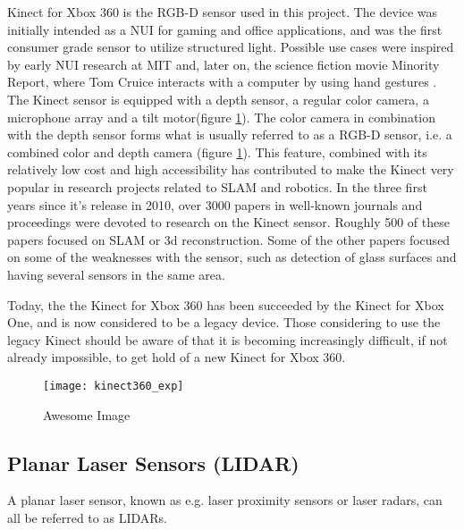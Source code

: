 Kinect for Xbox 360 is the RGB-D sensor used in this project. The device  was initially intended as a \ac{NUI} for gaming and office applications, and was the first consumer grade sensor to utilize structured light. Possible use cases were inspired by early \ac{NUI} research at \ac{MIT} and, later on, the science fiction movie Minority Report, where Tom Cruice interacts with a computer by using hand gestures \cite{kinect_book}. The Kinect sensor is equipped with a depth sensor, a regular color camera, a microphone array and a tilt motor(figure \ref{fig:kinect360_exp}). The color camera in combination with the depth sensor forms what is usually referred to as a RGB-D sensor, i.e. a combined color and depth camera (figure \ref{fig:kinect360_exp}). This feature, combined with its relatively low cost and high accessibility has contributed to make the Kinect very popular in research projects related to \ac{SLAM} and robotics. In the three first years since it's release in 2010, over 3000 papers in well-known journals and proceedings were devoted to research on the Kinect sensor. Roughly 500 of these papers focused on \ac{SLAM} or 3d reconstruction\cite{Berger2013}. Some of the other papers focused on some of the weaknesses with the sensor, such as detection of glass surfaces and having several sensors in the same area. 


Today, the the Kinect for Xbox 360 has been succeeded by the Kinect for Xbox One, and is now considered to be a legacy device. Those considering to use the legacy Kinect should be aware of that it is becoming increasingly difficult, if not already impossible, to get hold of a new Kinect for Xbox 360. 


\begin{figure}[p]
    \centering
    \texttt{[image: kinect360\_exp]}
    \caption{Awesome Image}
    \label{fig:kinect360_exp}
\end{figure}


\subsection{Planar Laser Sensors (LIDAR)}

A planar laser sensor, known as e.g. laser proximity sensors or laser radars, can all be referred to as LIDARs. 

